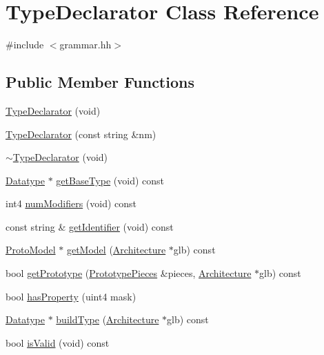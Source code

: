 \hypertarget{class_type_declarator}{}\section{Type\+Declarator Class Reference}
\label{class_type_declarator}


{\ttfamily \#include $<$grammar.\+hh$>$}

\subsection*{Public Member Functions}
\begin{DoxyCompactItemize}
\item 
\mbox{\hyperlink{class_type_declarator_a11bb06dfe9a9b13f10f9c6d04f852926}{Type\+Declarator}} (void)
\item 
\mbox{\hyperlink{class_type_declarator_a91e78ac3a94f17f0cd24e4b7be994593}{Type\+Declarator}} (const string \&nm)
\item 
\mbox{\hyperlink{class_type_declarator_a4cd7bc991831e053f971b342d8d63646}{$\sim$\+Type\+Declarator}} (void)
\item 
\mbox{\hyperlink{class_datatype}{Datatype}} $\ast$ \mbox{\hyperlink{class_type_declarator_a00220cba3d39b4eb2caf84d4817d9213}{get\+Base\+Type}} (void) const
\item 
int4 \mbox{\hyperlink{class_type_declarator_a4db93bcc2f88846c200f393cd3847077}{num\+Modifiers}} (void) const
\item 
const string \& \mbox{\hyperlink{class_type_declarator_ada70627420d0ae640cde706ede4dccf5}{get\+Identifier}} (void) const
\item 
\mbox{\hyperlink{class_proto_model}{Proto\+Model}} $\ast$ \mbox{\hyperlink{class_type_declarator_ac6dde9a81f0769baa9918eddfa7f86bb}{get\+Model}} (\mbox{\hyperlink{class_architecture}{Architecture}} $\ast$glb) const
\item 
bool \mbox{\hyperlink{class_type_declarator_a25458405bc1eeac18d85ff4e06ebb37b}{get\+Prototype}} (\mbox{\hyperlink{struct_prototype_pieces}{Prototype\+Pieces}} \&pieces, \mbox{\hyperlink{class_architecture}{Architecture}} $\ast$glb) const
\item 
bool \mbox{\hyperlink{class_type_declarator_a8db10df0a41685b9a392988d61598bfd}{has\+Property}} (uint4 mask)
\item 
\mbox{\hyperlink{class_datatype}{Datatype}} $\ast$ \mbox{\hyperlink{class_type_declarator_a1bdf96b09fb4a4095ec30ee49ee725b9}{build\+Type}} (\mbox{\hyperlink{class_architecture}{Architecture}} $\ast$glb) const
\item 
bool \mbox{\hyperlink{class_type_declarator_a504d55c927b65ed9fa0a5593d068af9c}{is\+Valid}} (void) const
\end{DoxyCompactItemize}
